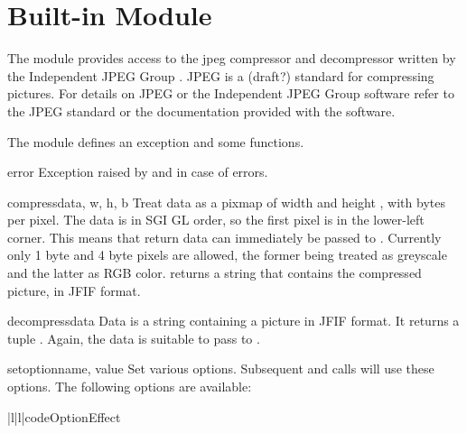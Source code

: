 \section{Built-in Module }
\label{module-jpeg}

The module  provides access to the jpeg compressor and
decompressor written by the Independent JPEG Group%
%
. JPEG is a (draft?)
standard for compressing pictures.  For details on JPEG or the
Independent JPEG Group software refer to the JPEG standard or the
documentation provided with the software.

The  module defines an exception and some functions.

\begin{excdesc}{error}
Exception raised by  and 
in case of errors.
\end{excdesc}

\begin{funcdesc}{compress}{data, w, h, b}
Treat data as a pixmap of width  and height , with
 bytes per pixel.  The data is in SGI GL order, so the first
pixel is in the lower-left corner. This means that 
return data can immediately be passed to .
Currently only 1 byte and 4 byte pixels are allowed, the former being
treated as greyscale and the latter as RGB color.
 returns a string that contains the compressed
picture, in JFIF format.
\end{funcdesc}

\begin{funcdesc}{decompress}{data}
Data is a string containing a picture in JFIF format. It
returns a tuple .  Again, the data is suitable to pass to
.
\end{funcdesc}

\begin{funcdesc}{setoption}{name, value}
Set various options.  Subsequent  and
 calls will use these options.  The following
options are available:

\begin{tableii}{|l|l|}{code}{Option}{Effect}
\end{tableii}
\end{funcdesc}
